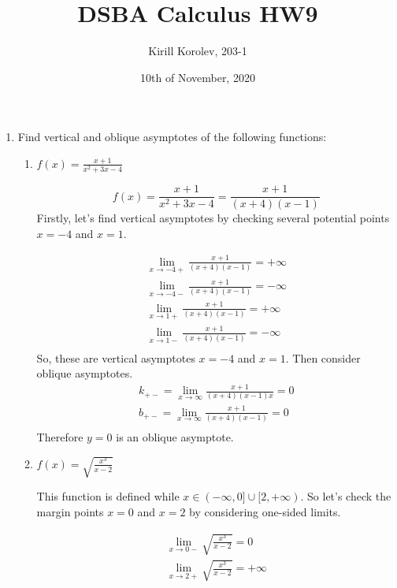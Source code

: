 \documentclass{article}
\title{DSBA Calculus HW9}
\author{Kirill Korolev, 203-1}
\date{10th of November, 2020}
\begin{document}
	
\maketitle

\begin{enumerate}
\item Find vertical and oblique asymptotes of the following functions:

\begin{enumerate}
\item $f(x)=\frac{x+1}{x^2+3x-4}$

\[f(x)=\frac{x+1}{x^2+3x-4}=\frac{x+1}{(x+4)(x-1)}\]
Firstly, let's find vertical asymptotes by checking several potential points $x=-4$ and $x=1$.

\begin{align*}
\lim_{x \to -4+} \frac{x+1}{(x+4)(x-1)}=+\infty\\
\lim_{x \to -4-} \frac{x+1}{(x+4)(x-1)}=-\infty\\
\lim_{x \to 1+} \frac{x+1}{(x+4)(x-1)}=+\infty\\
\lim_{x \to 1-} \frac{x+1}{(x+4)(x-1)}=-\infty\\
\end{align*}
So, these are vertical asymptotes $x=-4$ and $x=1$. Then consider oblique asymptotes.
\begin{align*}
k_{+-}=\lim_{x \to \infty} \frac{x+1}{(x+4)(x-1)x}=0\\
b_{+-}=\lim_{x \to \infty} \frac{x+1}{(x+4)(x-1)}=0\\
\end{align*}
Therefore $y = 0$ is an oblique asymptote.

\item $f(x)=\sqrt{\frac{x^3}{x-2}}$

This function is defined while $x \in (-\infty, 0] \cup [2, +\infty)$. So let's check the margin points $x=0$ and $x=2$ by considering one-sided limits.

\begin{align*}
\lim_{x \to 0-} \sqrt{\frac{x^3}{x-2}}=0\\
\lim_{x \to 2+} \sqrt{\frac{x^3}{x-2}}=+\infty\\
\end{align*}


\end{enumerate}
\end{enumerate}
\end{document}
